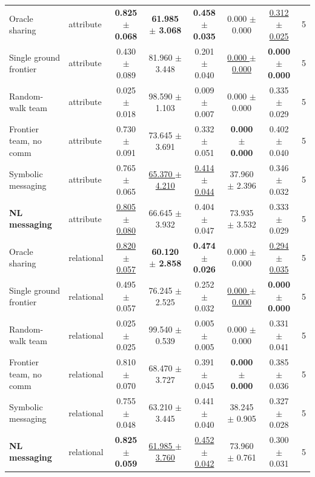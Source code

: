 \begin{tabular}{llcccccc}
Oracle sharing & attribute & \textbf{0.825 $\pm$ 0.068} & \textbf{61.985 $\pm$ 3.068} & \textbf{0.458 $\pm$ 0.035} & 0.000 $\pm$ 0.000 & \underline{0.312 $\pm$ 0.025} & 5 \\
Single ground frontier & attribute & 0.430 $\pm$ 0.089 & 81.960 $\pm$ 3.448 & 0.201 $\pm$ 0.040 & \underline{0.000 $\pm$ 0.000} & \textbf{0.000 $\pm$ 0.000} & 5 \\
Random-walk team & attribute & 0.025 $\pm$ 0.018 & 98.590 $\pm$ 1.103 & 0.009 $\pm$ 0.007 & 0.000 $\pm$ 0.000 & 0.335 $\pm$ 0.029 & 5 \\
Frontier team, no comm & attribute & 0.730 $\pm$ 0.091 & 73.645 $\pm$ 3.691 & 0.332 $\pm$ 0.051 & \textbf{0.000 $\pm$ 0.000} & 0.402 $\pm$ 0.040 & 5 \\
Symbolic messaging & attribute & 0.765 $\pm$ 0.065 & \underline{65.370 $\pm$ 4.210} & \underline{0.414 $\pm$ 0.044} & 37.960 $\pm$ 2.396 & 0.346 $\pm$ 0.032 & 5 \\
\textbf{NL messaging} & attribute & \underline{0.805 $\pm$ 0.080} & 66.645 $\pm$ 3.932 & 0.404 $\pm$ 0.047 & 73.935 $\pm$ 3.532 & 0.333 $\pm$ 0.029 & 5 \\
\midrule
Oracle sharing & relational & \underline{0.820 $\pm$ 0.057} & \textbf{60.120 $\pm$ 2.858} & \textbf{0.474 $\pm$ 0.026} & 0.000 $\pm$ 0.000 & \underline{0.294 $\pm$ 0.035} & 5 \\
Single ground frontier & relational & 0.495 $\pm$ 0.057 & 76.245 $\pm$ 2.525 & 0.252 $\pm$ 0.032 & \underline{0.000 $\pm$ 0.000} & \textbf{0.000 $\pm$ 0.000} & 5 \\
Random-walk team & relational & 0.025 $\pm$ 0.025 & 99.540 $\pm$ 0.539 & 0.005 $\pm$ 0.005 & 0.000 $\pm$ 0.000 & 0.331 $\pm$ 0.041 & 5 \\
Frontier team, no comm & relational & 0.810 $\pm$ 0.070 & 68.470 $\pm$ 3.727 & 0.391 $\pm$ 0.045 & \textbf{0.000 $\pm$ 0.000} & 0.385 $\pm$ 0.036 & 5 \\
Symbolic messaging & relational & 0.755 $\pm$ 0.048 & 63.210 $\pm$ 3.445 & 0.441 $\pm$ 0.040 & 38.245 $\pm$ 0.905 & 0.327 $\pm$ 0.028 & 5 \\
\textbf{NL messaging} & relational & \textbf{0.825 $\pm$ 0.059} & \underline{61.985 $\pm$ 3.760} & \underline{0.452 $\pm$ 0.042} & 73.960 $\pm$ 0.761 & 0.300 $\pm$ 0.031 & 5 \\
\bottomrule
\end{tabular}

